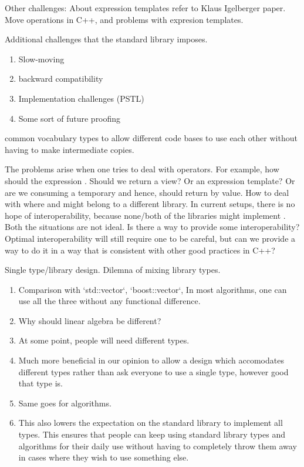 \documentclass[oneside,11pt,a4paper]{jbarticle}
\begin{document}
Other challenges:
About expression templates refer to Klaus Igelberger paper. Move operations in
C++, and problems with expresion templates.



Additional challenges that the standard library imposes.
\begin{enumerate}
  \item Slow-moving
  \item backward compatibility
  \item Implementation challenges (PSTL)
  \item Some sort of future proofing
\end{enumerate}


common vocabulary types to allow different code bases to use each other without
having to make intermediate copies.


The problems arise when one tries to deal with operators. For example, how
should the expression . Should we return a view? Or an
expression template? Or are we consuming a temporary and hence, should return by
value. How to deal with  where  and 
might belong to a different library. In current setups, there is no hope of
interoperability, because none/both of the libraries might implement
. Both the situations are not ideal.
Is there a way to provide some interoperability? Optimal interoperability will
still require one to be careful, but can we provide a way to do it in a way that
is consistent with other good practices in C++?


Single type/library design. Dilemna of mixing library types.
\begin{enumerate}
  \item Comparison with `std::vector`, `boost::vector`,
    In most algorithms, one can use all the three without any functional
    difference.

  \item Why should linear algebra be different?

  \item At some point, people will need different types.

  \item Much more beneficial in our opinion to allow a design which accomodates
    different types rather than ask everyone to use a single type, however good
    that type is.

  \item Same goes for algorithms.

  \item This also lowers the expectation on the standard library to implement
    all types. This ensures that people can keep using standard library types
    and algorithms for their daily use without having to completely throw them
    away in cases where they wish to use something else.
\end{enumerate}
\end{document}
